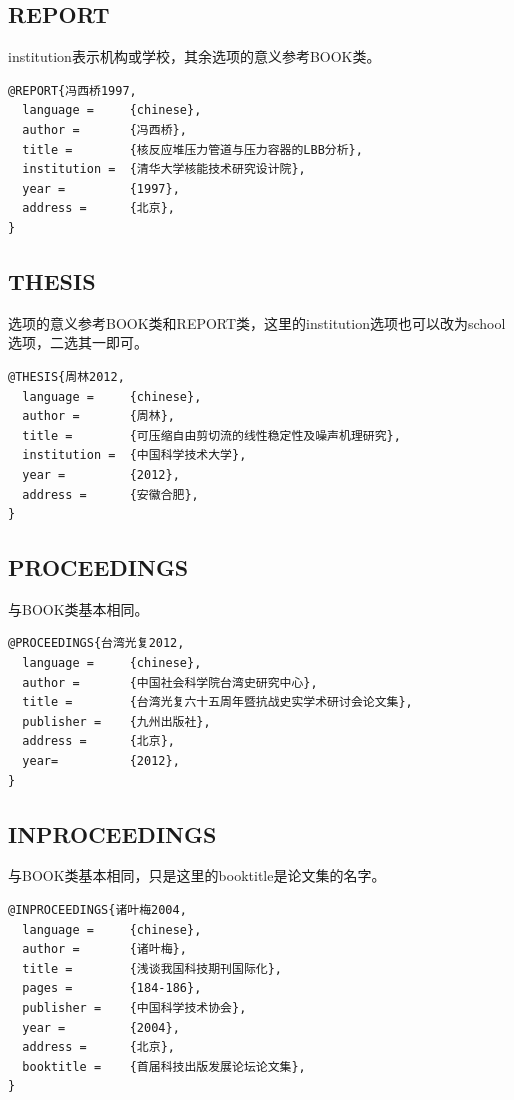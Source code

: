 \subsection{REPORT}
institution表示机构或学校，其余选项的意义参考BOOK类。
\begin{Verbatim}[]
@REPORT{冯西桥1997,
  language =     {chinese},
  author =       {冯西桥},
  title =        {核反应堆压力管道与压力容器的LBB分析},
  institution =  {清华大学核能技术研究设计院},
  year =         {1997},
  address =      {北京},
}
\end{Verbatim}

\subsection{THESIS}
选项的意义参考BOOK类和REPORT类，这里的institution选项也可以改为school选项，二选其一即可。
\begin{Verbatim}[]
@THESIS{周林2012,
  language =     {chinese},
  author =       {周林},
  title =        {可压缩自由剪切流的线性稳定性及噪声机理研究},
  institution =  {中国科学技术大学},
  year =         {2012},
  address =      {安徽合肥},
}
\end{Verbatim}

\subsection{PROCEEDINGS}
与BOOK类基本相同。
\begin{Verbatim}[]
@PROCEEDINGS{台湾光复2012,
  language =     {chinese},
  author =       {中国社会科学院台湾史研究中心},
  title =        {台湾光复六十五周年暨抗战史实学术研讨会论文集},
  publisher =    {九州出版社},
  address =      {北京},
  year=          {2012},
}
\end{Verbatim}


\subsection{INPROCEEDINGS}
与BOOK类基本相同，只是这里的booktitle是论文集的名字。
\begin{Verbatim}[]
@INPROCEEDINGS{诸叶梅2004,
  language =     {chinese},
  author =       {诸叶梅},
  title =        {浅谈我国科技期刊国际化},
  pages =        {184-186},
  publisher =    {中国科学技术协会},
  year =         {2004},
  address =      {北京},
  booktitle =    {首届科技出版发展论坛论文集},
}
\end{Verbatim}


